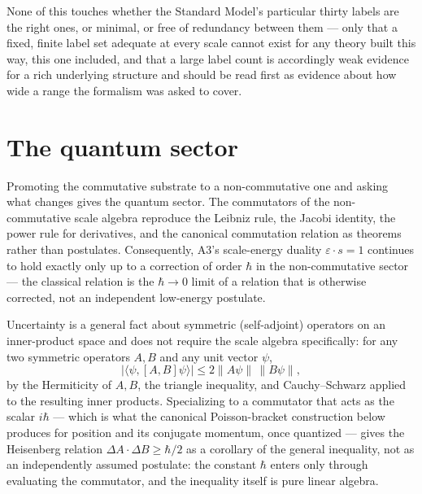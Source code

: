 \documentclass[pdflatex,sn-mathphys-num]{sn-jnl}
\theoremstyle{thmstyleone}
\theoremstyle{thmstylethree}
\theoremstyle{thmstyletwo}
\begin{document}
None of this touches whether the Standard Model's particular thirty
labels are the right ones, or minimal, or free of redundancy between
them — only that a fixed, finite label set adequate at every scale
cannot exist for any theory built this way, this one included, and that
a large label count is accordingly weak evidence for a rich underlying
structure and should be read first as evidence about how wide a range
the formalism was asked to cover.

\section{The quantum sector}\label{sec:quantum}

Promoting the commutative substrate to a non-commutative one and asking
what changes gives the quantum sector. The commutators of the
non-commutative scale algebra reproduce the Leibniz rule, the Jacobi
identity, the power rule for derivatives, and the canonical commutation
relation as theorems rather than postulates. Consequently, A3's scale-energy
duality $\varepsilon\cdot s=1$ continues to hold exactly only up to a
correction of order $\hbar$ in the non-commutative sector — the classical
relation is the $\hbar\to0$ limit of a relation that is otherwise
corrected, not an independent low-energy postulate.

Uncertainty is a general fact about symmetric (self-adjoint) operators on
an inner-product space and does not require the scale algebra
specifically: for any two symmetric operators $A,B$ and any unit vector
$\psi$,
\begin{equation}
|\langle\psi,[A,B]\psi\rangle| \le 2\|A\psi\|\,\|B\psi\|,
\end{equation}
by the Hermiticity of $A,B$, the triangle inequality, and Cauchy–Schwarz
applied to the resulting inner products. Specializing to a commutator
that acts as the scalar $i\hbar$ — which is what the canonical
Poisson-bracket construction below produces for position and its
conjugate momentum, once quantized — gives the Heisenberg relation
$\Delta A\cdot\Delta B \ge \hbar/2$ as a corollary of the general
inequality, not as an independently assumed postulate: the constant
$\hbar$ enters only through evaluating the commutator, and the
inequality itself is pure linear algebra.
\end{document}
